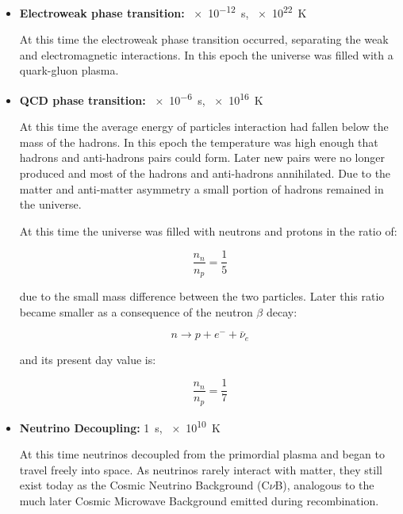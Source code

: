 \begin{itemize}
        \item \textbf{Electroweak phase transition:} \SI{e-12}{\second},
        \SI{e22}{\kelvin}

        At this time the electroweak phase transition occurred, separating
        the weak and electromagnetic interactions. In this epoch the
        universe was filled with a quark-gluon plasma.
        \item \textbf{QCD phase transition:} \SI{e-6}{\second},
        \SI{e16}{\kelvin}

        At this time the average energy of particles interaction had fallen
        below the mass of the hadrons. In this epoch the temperature was
        high enough that hadrons and anti-hadrons pairs could form. Later
        new pairs were no longer produced and most of the hadrons and
        anti-hadrons annihilated. Due to the matter and anti-matter
        asymmetry a small portion of hadrons remained in the universe.

        At this time the universe was filled with neutrons and protons in
        the ratio of:

        \begin{equation}
                \frac{n_n}{n_p} = \frac{1}{5}
        \end{equation}

        due to the small mass difference between the two particles. Later
        this ratio became smaller as a consequence of the neutron $\beta$
        decay:

        \begin{equation}
                n \rightarrow p + e^- + \bar\nu_e
        \end{equation}

        and its present day value is:

        \begin{equation}
                \frac{n_n}{n_p} = \frac{1}{7}
        \end{equation}

        \item \textbf{Neutrino Decoupling:} \SI{1}{\second},
        \SI{e10}{\kelvin}

        At this time neutrinos decoupled from the primordial plasma and
        began to travel freely into space. As neutrinos rarely interact
        with matter, they still exist today as the Cosmic
        Neutrino Background (C$\nu$B), analogous to the much later Cosmic
        Microwave Background emitted during recombination.


\end{itemize}
